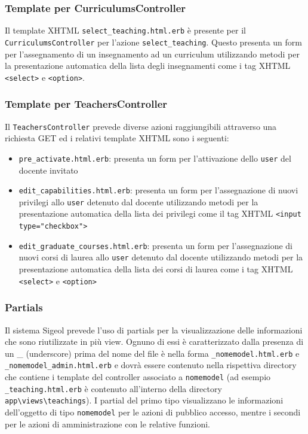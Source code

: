 \documentclass[11pt,a4paper]{article}
\begin{document}
\subsubsection*{Template per CurriculumsController}
Il template XHTML \verb|select_teaching.html.erb| è presente per il \\ \verb|CurriculumsController| per l'azione \verb|select_teaching|.  Questo presenta un form per l'assegnamento di un insegnamento ad un curriculum utilizzando metodi per la presentazione automatica della lista degli insegnamenti come i tag XHTML \verb|<select>| e \verb|<option>|.
\subsubsection*{Template per TeachersController}
Il \verb|TeachersController| prevede diverse azioni raggiungibili attraverso una richiesta GET ed i relativi template XHTML sono i seguenti:
\begin{itemize}
 \item \verb|pre_activate.html.erb|: presenta un form per l'attivazione dello \verb|user| del docente invitato
 \item \verb|edit_capabilities.html.erb|: presenta un form per l'assegnazione di nuovi privilegi allo \verb|user| detenuto dal docente utilizzando metodi per la presentazione automatica della lista dei privilegi come il tag XHTML \verb|<input type="checkbox">|
 \item \verb|edit_graduate_courses.html.erb|: presenta un form per l'assegnazione di nuovi corsi di laurea allo \verb|user| detenuto dal docente utilizzando metodi per la presentazione automatica della lista dei corsi di laurea come i tag XHTML \verb|<select>| e \verb|<option>|
\end{itemize}
\subsubsection{Partials}
Il sistema Sigeol prevede l'uso di partials per la visualizzazione delle informazioni che sono riutilizzate in più view. Ognuno di essi è caratterizzato dalla presenza di un \_ (underscore) prima del nome del file è nella forma \verb|_nomemodel.html.erb| e \verb|_nomemodel_admin.html.erb| e dovrà essere contenuto nella rispettiva directory che contiene i template del controller associato a \verb|nomemodel| (ad esempio \verb|_teaching.html.erb| è contenuto all'interno della directory \verb|app\views\teachings|). I partial del primo tipo visualizzano le informazioni dell'oggetto di tipo \verb|nomemodel| per le azioni di pubblico accesso, mentre i secondi per le azioni di amministrazione con le relative funzioni.
\end{document}
